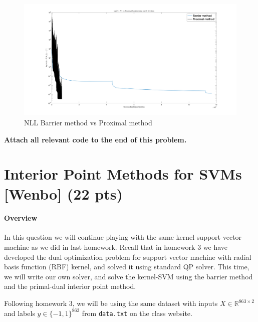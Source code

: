 \documentclass{article}
\theoremstyle{remark}
\theoremstyle{definition}
\begin{document}
\begin{enumerate}[(a)]
\begin{enumerate}
{        \begin{figure}
            \centering
            \includegraphics[scale=.15]{barrier-prox.png}
            \caption{NLL Barrier method vs Proximal method}
            \label{fig:barrier-prox}
        \end{figure}
      }
	    \end{enumerate}
\end{enumerate}

\textbf{Attach all relevant code to the end of this problem.}
\section{Interior Point Methods for SVMs [Wenbo] (22 pts)}

\paragraph{Overview} In this question we will continue playing with the same kernel support vector machine as we did in last homework. Recall that in homework 3 we have developed the dual optimization problem for support vector machine with radial basis function (RBF) kernel, and solved it using standard QP solver. This time, we will write our own solver, and solve the kernel-SVM using the
barrier method and the primal-dual interior point method.

Following homework 3, we will be using the same dataset with inputs $X \in \mathbb R^{863 \times 2}$ and labels $y \in \{-1, 1\}^{863}$ from \texttt{data.txt} on the class website.
\end{document}
